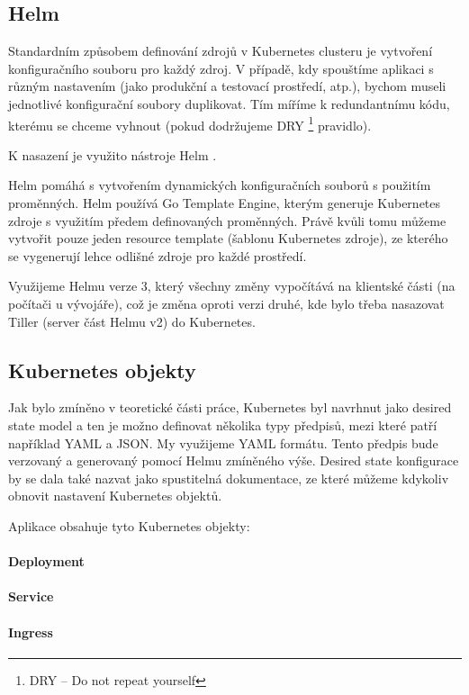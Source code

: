 \documentclass[thesis=M,czech]{FITthesis}[2019/12/23]
\theoremstyle{plain}
\theoremstyle{definition}
\begin{document}
\subsection{Helm}

Standardním způsobem definování zdrojů v Kubernetes clusteru je vytvoření konfiguračního souboru pro každý zdroj. V případě, kdy spouštíme aplikaci s různým nastavením (jako produkční a testovací prostředí, atp.), bychom museli jednotlivé konfigurační soubory duplikovat. Tím míříme k redundantnímu kódu, kterému se chceme vyhnout (pokud dodržujeme DRY \footnote{DRY -- Do not repeat yourself} pravidlo).

K nasazení je využito nástroje Helm \cite{helm-docs}.

Helm pomáhá s vytvořením dynamických konfiguračních souborů s použitím proměnných. Helm používá Go Template Engine, kterým generuje Kubernetes zdroje s využitím předem definovaných proměnných. Právě kvůli tomu můžeme vytvořit pouze jeden resource template (šablonu Kubernetes zdroje), ze kterého se vygenerují lehce odlišné zdroje pro každé prostředí. 

Využijeme Helmu verze 3, který všechny změny vypočítává na klientské části (na počítači u vývojáře), což je změna oproti verzi druhé, kde bylo třeba nasazovat Tiller (server část Helmu v2) do Kubernetes.

\subsection{Kubernetes objekty}


Jak bylo zmíněno v teoretické části práce, Kubernetes byl navrhnut jako desired state model a ten je možno definovat několika typy předpisů, mezi které patří například YAML a JSON. My využijeme YAML formátu. Tento předpis bude verzovaný a generovaný pomocí Helmu zmíněného výše. Desired state konfigurace by se dala také nazvat jako spustitelná dokumentace, ze které můžeme kdykoliv obnovit nastavení Kubernetes objektů. 

Aplikace obsahuje tyto Kubernetes objekty:

\paragraph{Deployment}
\paragraph{Service}
\paragraph{Ingress}
\end{document}
